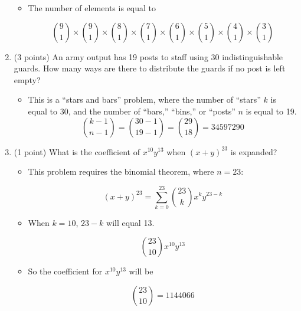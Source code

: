\documentclass[11pt]{article}
\begin{document}
\begin{enumerate}
\begin{itemize}
\item The number of elements is equal to

\begin{equation*}
{9 \choose 1}\times{9 \choose 1}\times{8 \choose 1}\times{7 \choose 1}\times{6 \choose 1}\times{5 \choose 1}\times{4 \choose 1}\times{3 \choose 1}
\end{equation*}

\end{itemize}


\item (3 points) An army output has 19 posts to staff using 30 indistinguishable guards. How many ways are there to distribute the guards if no post is left empty?

\begin{itemize}
\item This is a ``stars and bars'' problem, where the number of ``stars'' $k$ is equal to 30, and the number of ``bars,'' ``bins,'' or ``posts'' $n$ is equal to 19.
\begin{equation*}
{k - 1 \choose n - 1} = {30 - 1 \choose 19 - 1} = {29 \choose 18} = 34597290
\end{equation*}
\end{itemize}



\item (1 point) What is the coefficient of $x^{10}y^{13}$ when $(x + y)^{23}$ is expanded?

\begin{itemize}

\item This problem requires the binomial theorem, where $n = 23$:

\begin{equation*}
(x + y)^{23} = \sum_{k = 0}^{23} {23 \choose k}x^ky^{23 - k}
\end{equation*}

\item When $k = 10$, $23 - k$ will equal 13.

\begin{equation*}
{23 \choose 10}x^{10} y^{13}
\end{equation*}

\item So the coefficient for $x^{10} y^{13}$ will be

\begin{equation*}
{23 \choose 10} = 1144066
\end{equation*}


\end{itemize}
\end{enumerate}
\end{document}
